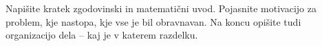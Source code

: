 \documentclass[../TG_magistrsko_delo_sections.tex]{subfiles}
\begin{document}
Napišite kratek zgodovinski in matematični uvod.  Pojasnite motivacijo za problem, kje
nastopa, kje vse je bil obravnavan. Na koncu opišite tudi organizacijo dela -- kaj je v
katerem razdelku.
\end{document}
